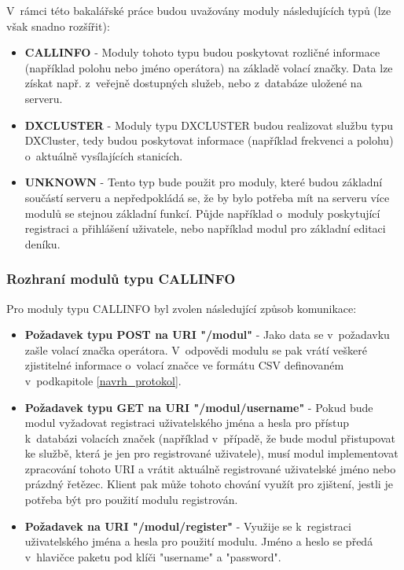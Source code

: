 V~rámci této bakalářské práce budou uvažovány moduly následujících typů (lze
však snadno rozšířit):

\begin{itemize}
\item \textbf{CALLINFO} - Moduly tohoto typu budou poskytovat rozličné informace (například polohu nebo jméno operátora)
na základě volací značky. Data lze získat např. z~veřejně dostupných služeb, nebo z~databáze uložené na serveru.
\item \textbf{DXCLUSTER} - Moduly typu DXCLUSTER budou realizovat službu typu
DXCluster, tedy budou poskytovat informace (například frekvenci a polohu)
o~aktuálně vysílajících stanicích.
\item \textbf{UNKNOWN} - Tento typ bude použit pro moduly, které budou základní součástí serveru a nepředpokládá
se, že by bylo potřeba mít na serveru více modulů se stejnou základní funkcí. Půjde například o~moduly poskytující
registraci a přihlášení uživatele, nebo například modul pro základní editaci deníku.
\end{itemize}

\subsubsection{Rozhraní modulů typu CALLINFO}

Pro moduly typu CALLINFO byl zvolen následující způsob komunikace:

\begin{itemize}
\item \textbf{Požadavek typu POST na URI "/modul"} - %
Jako data se v~požadavku zašle volací značka operátora. V~odpovědi modulu se pak
vrátí
veškeré zjistitelné informace o~volací značce ve formátu CSV definovaném v~podkapitole \ref{navrh_protokol}.
\item \textbf{Požadavek typu GET na URI "/modul/username"} - %
Pokud bude modul vyžadovat registraci uživatelského jména a hesla pro
přístup k~databázi volacích značek (například v~případě, že bude modul
přistupovat ke službě, která je jen pro registrované uživatele), musí modul
implementovat zpracování tohoto URI a vrátit aktuálně registrované uživatelské jméno nebo prázdný řetězec. Klient pak může tohoto
chování využít pro zjištení, jestli je potřeba být pro použití modulu registrován.
\item \textbf{Požadavek na URI "/modul/register"} - Využije se k~registraci uživatelského jména a hesla pro použití modulu.
Jméno a heslo se předá v~hlavičce paketu pod klíči "username" a "password".
\end{itemize}

